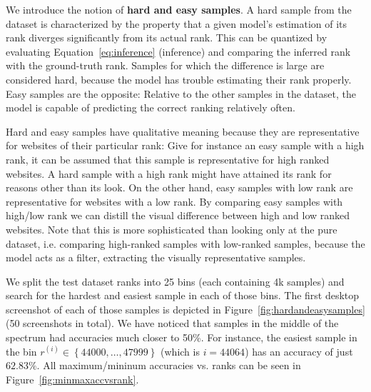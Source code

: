 \begin{figure}
    \label{fig:activationmaps}
\end{figure}

We introduce the notion of \textbf{hard and easy samples}. A hard sample from the dataset is characterized by the property that a given model's estimation of its rank diverges significantly from its actual rank. This can be quantized by evaluating Equation~\ref{eq:inference} (inference) and comparing the inferred rank with the ground-truth rank. Samples for which the difference is large are considered hard, because the model has trouble estimating their rank properly. Easy samples are the opposite: Relative to the other samples in the dataset, the model is capable of predicting the correct ranking relatively often.

Hard and easy samples have qualitative meaning because they are representative for websites of their particular rank: Give for instance an easy sample with a high rank, it can be assumed that this sample is representative for high ranked websites. A hard sample with a high rank might have attained its rank for reasons other than its look. On the other hand, easy samples with low rank are representative for websites with a low rank. By comparing easy samples with high/low rank we can distill the visual difference between high and low ranked websites. Note that this is more sophisticated than looking only at the pure dataset, i.e. comparing high-ranked samples with low-ranked samples, because the model acts as a filter, extracting the visually representative samples.

We split the test dataset ranks into 25 bins (each containing 4k samples) and search for the hardest and easiest sample in each of those bins. The first desktop screenshot of each of those samples is depicted in Figure~\ref{fig:hardandeasysamples} (50 screenshots in total). We have noticed that samples in the middle of the spectrum had accuracies much closer to 50\%. For instance, the easiest sample in the bin $r^{(i)}\in{\left\{44000, \dots, 47999\right\}}$ (which is $i=44064$) has an accuracy of just $62.83\%$. All maximum/mininum accuracies vs. ranks can be seen in Figure~\ref{fig:minmaxaccvsrank}.


